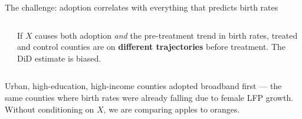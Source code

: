 \documentclass[aspectratio=169,12pt]{beamer}
\begin{document}
\begin{frame}{The challenge: adoption correlates with everything that predicts birth rates}

\begin{columns}[c]
\begin{center}
\end{center}

\begin{alertblock}{}
\small
If $X$ causes both adoption \emph{and} the pre-treatment trend in birth rates,
treated and control counties are on \textbf{different trajectories} before treatment.
The DiD estimate is biased.
\end{alertblock}
\end{columns}

\vspace{0.4em}
{\small\color{OldMortar}
Urban, high-education, high-income counties adopted broadband first ---
the same counties where birth rates were already falling due to female LFP growth.
Without conditioning on $X$, we are comparing apples to oranges.}
\end{frame}

\end{document}
